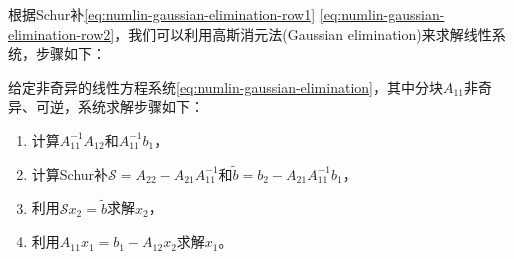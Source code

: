 根据Schur补\eqref{eq:numlin-gaussian-elimination-row1} \eqref{eq:numlin-gaussian-elimination-row2}，我们可以利用高斯消元法(Gaussian elimination)来求解线性系统，步骤如下：
\begin{algorithm}[高斯消元法求解线性系统]
  \label{algorithm:numlin-gaussian-elimination}
  给定非奇异的线性方程系统\eqref{eq:numlin-gaussian-elimination}，其中分块$A_{11}$非奇异、可逆，系统求解步骤如下：
  \begin{enumerate}
    \item 计算$A_{11}^{-1} A_{12}$和$A_{11}^{-1} b_{1}$，
    \item 计算Schur补$\mathcal{S} = A_{22} - A_{21}A_{11}^{-1}$和$\tilde{b} = b_{2} - A_{21} A_{11}^{-1} b_{1}$，
    \item 利用$\mathcal{S} x_{2} = \tilde{b}$求解$x_{2}$，
    \item 利用$A_{11} x_{1} = b_{1} - A_{12} x_{2}$求解$x_{1}$。
  \end{enumerate}
\end{algorithm}

